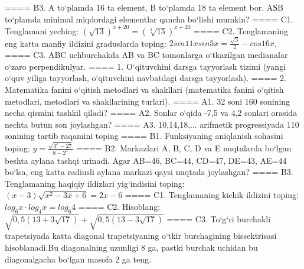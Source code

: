 ====
B3. A to‘plamda 16 ta element, B to‘plamda 18 ta element bor. AЅB to‘plamda minimal miqdordagi elementlar qancha bo‘lishi mumkin?
====
C1. Tenglamani yeching: \((\sqrt{13}) ^{x + 20} = (\sqrt[3]{15}) ^{x + 20}\)
====
C2. Tenglamaning eng katta manfiy ildizini graduslarda toping: \(2sin11xsin5x = \frac{\sqrt{3}}{2} - cos16x\).
====
C3. ABC uchburchakda AB va BC tomonlarga o‘tkazilgan medianalar o‘zaro perpendikulyar.
====
1. O‘qituvchini darsga tayyorlash tizimi (yangi o‘quv yiliga tayyorlash, o‘qituvchini navbatdagi darsga tayyorlash).
====
2. Matematika fanini o‘qitish metodlari va shakllari (matematika fanini o‘qitish metodlari, metodlari va shakllarining turlari).
====
A1. 32 soni 160 sonining necha qismini tashkil qiladi?
====
A2. Sonlar o‘qida -7,5 va 4,2 sonlari orasida nechta butun son joylashgan?
====
A3. 10,14,18,... arifmetik progressiyada 110 sonining tartib raqamini toping
====
B1. Funksiyaning aniqlanish sohasini toping: \(y = \frac{\sqrt{3^{x} - 27}}{8 - 2^{x}}\)
====
B2. Markazlari A, B, C, D va E nuqtalarda bo‘lgan beshta aylana tashqi urinadi. Agar AB=46, BC=44, CD=47, DE=43, AE=44 bo‘lsa, eng katta radiusli aylana markazi qaysi nuqtada joylashgan?
====
B3. Tenglamaning haqiqiy ildizlari yig‘indisini toping: \((x-3) \sqrt{x^{2} - 3x + 6} = 2x - 6\)
====
C1. Tenglamaning kichik ildizini toping: \(log_{6}x \cdot log_{4}x = log_{6}4\)
====
C2. Hisoblang: \(\sqrt{0,5 (13 + 3\sqrt{17}) } + \sqrt{0,5 (13 - 3\sqrt{17}) }\)
====
C3. To‘g‘ri burchakli trapetsiyada katta diagonal trapetsiyaning o‘tkir burchagining bissektrisasi hisoblanadi.Bu diagonalning uzunligi 8 ga, pastki burchak uchidan bu diagonalgacha bo‘lgan masofa 2 ga teng.